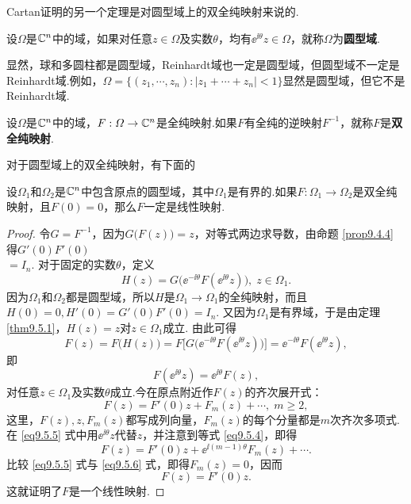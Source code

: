 Cartan证明的另一个定理是对圆型域上的双全纯映射来说的.
\begin{definition}\label{def9.5.2}
  设$\Omega$是$\mathbb C^n$中的域，如果对任意$z\in\Omega$及实数$\theta$，均有$\ee^{\ii\theta}z\in\Omega$，就称$\Omega$为\textbf{圆型域}.
\end{definition}

显然，球和多圆柱都是圆型域，Reinhardt域也一定是圆型域，但圆型域不一定是Reinhardt域.例如，$\Omega=\{(z_1,\cdots,z_n):|z_1+\cdots+z_n|<1\}$显然是圆型域，但它不是Reinhardt域.
\begin{definition}\label{def9.5.3}
  设$\Omega$是$\mathbb C^n$中的域，$F:\varOmega\to\mathbb C^n$是全纯映射.如果$F$有全纯的逆映射$F^{-1}$，就称$F$是\textbf{双全纯映射}.
\end{definition}

对于圆型域上的双全纯映射，有下面的
\begin{theorem}\label{thm9.5.4}
  设$\Omega_1$和$\Omega_2$是$\mathbb C^n$中包含原点的圆型域，其中$\Omega_1$是有界的.如果$F:\Omega_1\to\Omega_2$是双全纯映射，且$F(0)=0$，那么$F$一定是线性映射.
\end{theorem}
\begin{proof}
  令$G=F^{-1}$，因为$G\big(F(z)\big)=z$，对等式两边求导数，由命题 \ref{prop9.4.4} 得$G'(0)F'(0)$\\$= I_n$. 对于固定的实数$\theta$，定义
  \[
   H(z) = G\big(\ee^{-\ii\theta}F(\ee^{\ii\theta}z)\big),\;z\in\Omega_1.
  \]
  因为$\Omega_1$和$\Omega_2$都是圆型域，所以$H$是$\Omega_1\to\Omega_1$的全纯映射，而且
  $H(0)=0,H'(0)=G'(0)F'(0)= I_n$. 又因为$\Omega_1$是有界域，于是由定理 \ref{thm9.5.1}，$H(z)=z$对$z\in\Omega_1$成立. 由此可得
  \[
    F(z) = F\big(H(z)\big) = F\big[G\big(\ee^{-\ii\theta}F(\ee^{\ii\theta}z)\big)\big]
    = \ee^{-\ii\theta}F(\ee^{\ii\theta}z),
  \]
  即
  \begin{equation}\label{eq9.5.4}
    F(\ee^{\ii\theta}z) = \ee^{\ii\theta}F(z),
  \end{equation}
  对任意$z\in\Omega_1$及实数$\theta$成立.今在原点附近作$F(z)$的齐次展开式：
  \begin{equation}\label{eq9.5.5}
    F(z) = F'(0)z + F_m(z) + \cdots,\;m\ge2,
  \end{equation}
  这里，$F(z),z,F_m(z)$都写成列向量，$F_m(z)$的每个分量都是$m$次齐次多项式.在 \eqref{eq9.5.5} 式中用$\ee^{\ii\theta}z$代替$z$，并注意到等式 \eqref{eq9.5.4}，即得
  \begin{equation}\label{eq9.5.6}
    F(z) = F'(0)z + \ee^{\ii(m-1) \theta}F_m(z)+\cdots.
  \end{equation}
  比较 \eqref{eq9.5.5} 式与 \eqref{eq9.5.6} 式，即得$F_m(z)=0$，因而
  \[
    F(z) = F'(0)z.
  \]
  这就证明了$F$是一个线性映射.
\end{proof}

